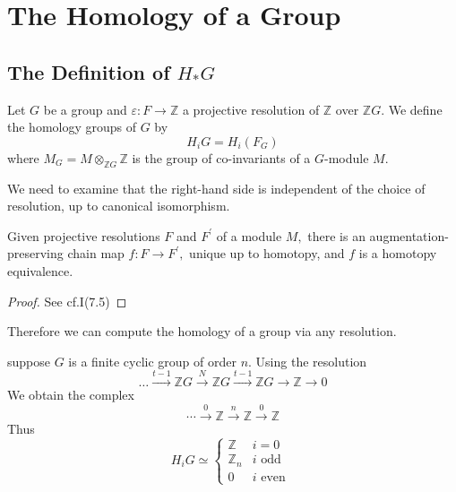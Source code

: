 \section{The Homology of a Group}
\subsection{The Definition of $H_\ast G$}
\label{chap2.1}
\begin{definition}
Let $G$ be a group and $\varepsilon: F \rightarrow \mathbb{Z}$ a projective resolution of $\mathbb{Z}$ over $\mathbb{Z} G$. We define the homology groups of $G$ by
\[
H_{i} G=H_{i}\left(F_{G}\right)
\]
where $M_{G}=M\otimes_{\mathbb{Z}G}\mathbb{Z}$ is the group of co-invariants of a $G$-module $M$.
\end{definition}
We need to examine that the right-hand side is independent of the choice of resolution, up to canonical isomorphism. 
\begin{theorem}
Given projective resolutions $F$ and $F^{\prime}$ of a module $M,$ there is an augmentation-preserving chain map $f: F \rightarrow F^{\prime},$ unique up to homotopy, and $f$
is a homotopy equivalence.
\end{theorem}
\begin{proof}
See \cite{brown2012cohomology}cf.I(7.5)
\end{proof}

Therefore we can compute the homology of a group via any resolution. 

\begin{example}
\label{example1}
suppose $G$ is a finite cyclic group of order $n$. Using the resolution
\[
\ldots \stackrel{t-1}{\longrightarrow} \mathbb{Z} G \stackrel{N}{\rightarrow} \mathbb{Z} G \stackrel{t-1}{\longrightarrow} \mathbb{Z} G \rightarrow \mathbb{Z} \rightarrow 0
\]
We obtain the complex
\[
\cdots \stackrel{0}{\rightarrow} \mathbb{Z} \stackrel{n}{\rightarrow} \mathbb{Z} \stackrel{0}{\rightarrow} \mathbb{Z}
\]
Thus
\[
H_{i} G \simeq \left\{\begin{array}{ll}
\mathbb{Z} & i=0 \\
\mathbb{Z}_{n} & i \text { odd } \\
0 & i \text { even }
\end{array}\right.
\]
\end{example}

